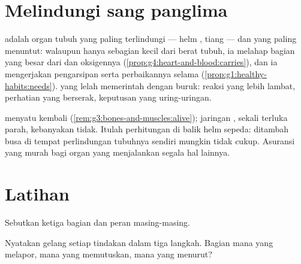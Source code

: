 \section{Melindungi sang panglima}

\begin{proposition}\label{prop:g5:brain-in-command:protect}
 adalah organ tubuh yang paling terlindungi --- helm ,
tiang  --- dan yang paling menuntut: walaupun hanya
sebagian kecil dari berat tubuh, ia melahap bagian yang besar dari
 dan oksigennya
(\cref{prop:g4:heart-and-blood:carries}), dan ia mengerjakan
pengarsipan serta perbaikannya selama \emph{}
(\cref{prop:g1:healthy-habits:needs}).  yang lelah memerintah
dengan buruk: reaksi yang lebih lambat, perhatian yang berserak,
keputusan yang uring-uringan.
\end{proposition}
\admitted

\begin{example}\label{ex:g5:brain-in-command:helmet}
 menyatu kembali (\cref{rem:g3:bones-and-muscles:alive});
jaringan , sekali terluka parah, kebanyakan tidak. Itulah
perhitungan di balik helm sepeda:  ditambah busa di tempat
perlindungan tubuhnya sendiri mungkin tidak cukup. Asuransi yang murah
bagi organ yang menjalankan segala hal lainnya.
\end{example}

\section{Latihan}

\begin{exercise}[$\star$]\label{exo:g5:brain-in-command:1}
Sebutkan ketiga bagian  dan peran masing-masing.
\end{exercise}

\begin{exercise}[$\star$]\label{exo:g5:brain-in-command:2}
Nyatakan gelang setiap tindakan dalam tiga langkah. Bagian mana yang
melapor, mana yang memutuskan, mana yang menurut?
\end{exercise}

